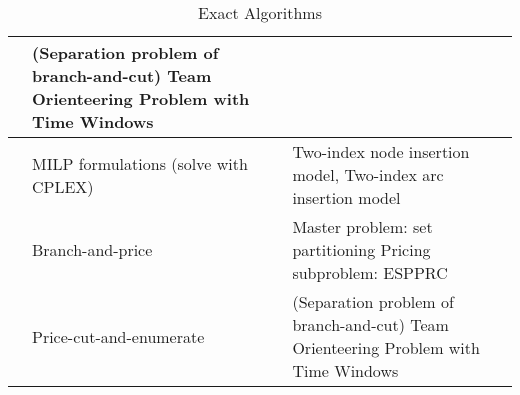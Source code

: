 \begin{table}[]
\begin{tabular}{@{}>{\raggedright}p{3.5cm}>{\raggedright}p{4cm}p{6cm}@{}}
              & (Separation problem of branch-and-cut) Team Orienteering Problem with Time Windows         \\
        \midrule
        \cite{neira2020new}
              & MILP formulations (solve with CPLEX)
              & Two-index node insertion model,
        \newline Two-index arc insertion model                                                             \\
        \midrule
        \cite{huang2021multi}
              & Branch-and-price
              & Master problem: set partitioning
        \newline Pricing subproblem: ESPPRC                                                                \\
        \midrule
        \cite{yang2023exact}
              & Price-cut-and-enumerate
              & (Separation problem of branch-and-cut) Team Orienteering Problem with Time Windows         \\
        \bottomrule
    \end{tabular}
    \caption{Exact Algorithms}
    \label{table:2}
\end{table}



